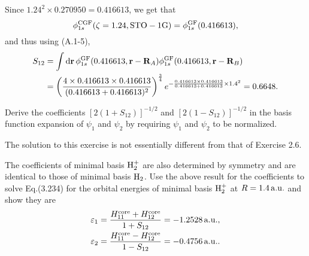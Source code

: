\documentclass[a4paper]{book}
\newcounter{exercise}[chapter]
\newcounter{solution}[chapter]
\newcommand*{\dif}{\mathop{}\!\mathrm{d}}
\newcommand{\core}{{\rm core}}
\newcommand{\au}{{\rm a.u.}}
\newcommand{\bfr}{{\bf r}}
\newcommand{\bfR}{{\bf R}}
\begin{document}
	\begin{solution}
	
	Since $1.24^2 \times 0.270950 = 0.416613$, we get that	
	\[
		\phi^{\rm CGF}_{1s}( \zeta = 1.24, {\rm STO-1G} ) = \phi^{\rm GF}_{1s} (0.416613) ,
	\]	
	and thus using (A.1-5),
	\begin{align*}
		S_{12} &= \int \dif \bfr \, \phi^{\rm GF}_{1s} (0.416613 , \bfr - \bfR_A ) \phi^{\rm GF}_{1s} (0.416613 , \bfr - \bfR_B) \\
		&= \left( \frac{ 4 \times 0.416613 \times 0.416613 }{ ( 0.416613 + 0.416613 )^2 } \right)^{\frac{3}{4}} e^{ - \frac{ 0.416613 \times 0.416613 }{ 0.416613 + 0.416613 } \times 1.4^2 } = 0.6648 .
	\end{align*}

	\end{solution}
	
	\begin{exercise}
	Derive the coefficients $[2(1+S_{12})]^{-1/2}$ and $[2(1-S_{12})]^{-1/2}$ in the basis function expansion of $\psi_1$ and $\psi_2$ by requiring $\psi_1$ and $\psi_2$ to be normalized.
	\end{exercise}
	
	\begin{solution}
	
	The solution to this exercise is not essentially different from that of Exercise 2.6.

	\end{solution}
	
	\begin{exercise}
	The coefficients of minimal basis ${\rm H}^+_2$ are also determined by symmetry and are identical to those of minimal basis $\ce{H2}$. Use the above result for the coefficients to solve Eq.(3.234) for the orbital energies of minimal basis ${\rm H}^+_2$ at $R = 1.4\, \au$ and show they are
	\begin{align*}
		\varepsilon_1 &= \frac{ H^\core_{11} + H^\core_{12} }{ 1 + S_{12} } = -1.2528  \, \au , \\
		\varepsilon_2 &= \frac{ H^\core_{11} - H^\core_{12} }{ 1 - S_{12} } = -0.4756 \, \au .
	\end{align*}
	\end{exercise}
	
\end{document}
